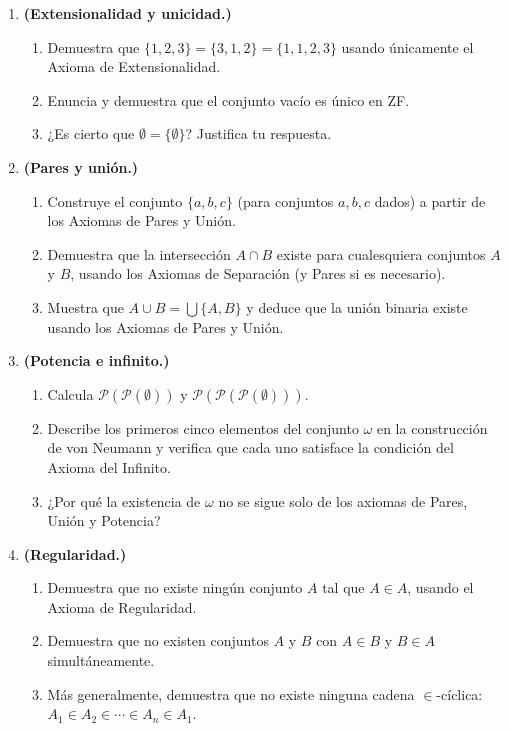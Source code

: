 \begin{enumerate}[leftmargin=2em, label=\textbf{P\arabic*.}, itemsep=0.8em]

  \item \textbf{(Extensionalidad y unicidad.)}
  \begin{enumerate}[label=(\alph*)]
    \item Demuestra que $\{1, 2, 3\} = \{3, 1, 2\} = \{1, 1, 2, 3\}$ usando únicamente el Axioma de Extensionalidad.
    \item Enuncia y demuestra que el conjunto vacío es único en ZF.
    \item ¿Es cierto que $\emptyset = \{\emptyset\}$? Justifica tu respuesta.
  \end{enumerate}

  \item \textbf{(Pares y unión.)}
  \begin{enumerate}[label=(\alph*)]
    \item Construye el conjunto $\{a, b, c\}$ (para conjuntos $a, b, c$ dados) a partir de los Axiomas de Pares y Unión.
    \item Demuestra que la intersección $A \cap B$ existe para cualesquiera conjuntos $A$ y $B$, usando los Axiomas de Separación (y Pares si es necesario).
    \item Muestra que $A \cup B = \bigcup\{A, B\}$ y deduce que la unión binaria existe usando los Axiomas de Pares y Unión.
  \end{enumerate}

  \item \textbf{(Potencia e infinito.)}
  \begin{enumerate}[label=(\alph*)]
    \item Calcula $\mathcal{P}(\mathcal{P}(\emptyset))$ y $\mathcal{P}(\mathcal{P}(\mathcal{P}(\emptyset)))$.
    \item Describe los primeros cinco elementos del conjunto $\omega$ en la construcción de von Neumann y verifica que cada uno satisface la condición del Axioma del Infinito.
    \item ¿Por qué la existencia de $\omega$ no se sigue solo de los axiomas de Pares, Unión y Potencia?
  \end{enumerate}

  \item \textbf{(Regularidad.)}
  \begin{enumerate}[label=(\alph*)]
    \item Demuestra que no existe ningún conjunto $A$ tal que $A \in A$, usando el Axioma de Regularidad.
    \item Demuestra que no existen conjuntos $A$ y $B$ con $A \in B$ y $B \in A$ simultáneamente.
    \item Más generalmente, demuestra que no existe ninguna cadena $\in$-cíclica: $A_1 \in A_2 \in \cdots \in A_n \in A_1$.
  \end{enumerate}


\end{enumerate}
